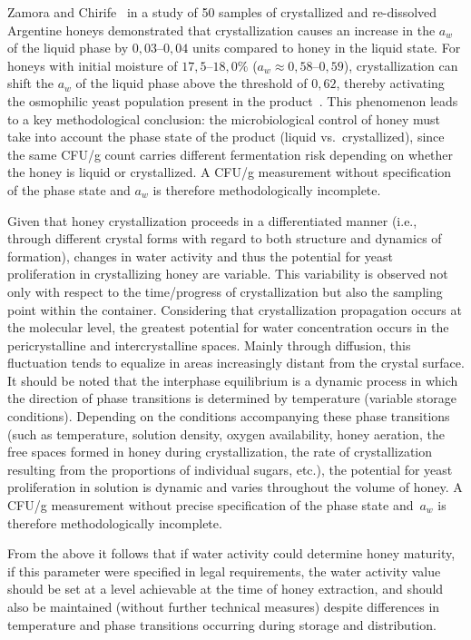 Zamora and Chirife~\cite{zamora2006} in a study of 50 samples
of crystallized and re-dissolved Argentine honeys demonstrated
that crystallization causes an increase in the $a_w$ of the liquid
phase by $0{,}03$--$0{,}04$ units compared to honey in the liquid
state. For honeys with initial moisture of $17{,}5$--$18{,}0\%$
($a_w \approx 0{,}58$--$0{,}59$), crystallization can shift the
$a_w$ of the liquid phase above the threshold of $0{,}62$, thereby
activating the osmophilic yeast population present in the
product~\cite{zamora2006,ijfans2019}.
This phenomenon leads to a key methodological conclusion: the
microbiological control of honey must take into account the phase
state of the product (liquid vs.\ crystallized), since the same
CFU/g count carries different fermentation risk depending on whether
the honey is liquid or crystallized. A CFU/g measurement without
specification of the phase state and $a_w$ is therefore
methodologically incomplete.

Given that honey crystallization proceeds in a differentiated
manner (i.e., through different crystal forms with regard to both
structure and dynamics of formation), changes in water activity
and thus the potential for yeast proliferation in crystallizing
honey are variable. This variability is observed not only with
respect to the time/progress of crystallization but also the
sampling point within the container. Considering that crystallization
propagation occurs at the molecular level, the greatest potential
for water concentration occurs in the pericrystalline and
intercrystalline spaces. Mainly through diffusion, this fluctuation
tends to equalize in areas increasingly distant from the crystal
surface. It should be noted that the interphase equilibrium is a
dynamic process in which the direction of phase transitions is
determined by temperature (variable storage conditions). Depending
on the conditions accompanying these phase transitions (such as
temperature, solution density, oxygen availability, honey aeration,
the free spaces formed in honey during crystallization, the rate of
crystallization resulting from the proportions of individual sugars,
etc.), the potential for yeast proliferation in solution is dynamic
and varies throughout the volume of honey. A CFU/g measurement
without precise specification of the phase state and~$a_w$ is
therefore methodologically incomplete.

From the above it follows that if water activity could determine
honey maturity, if this parameter were specified in legal
requirements, the water activity value should be set at a level
achievable at the time of honey extraction, and should also be
maintained (without further technical measures) despite differences
in temperature and phase transitions occurring during storage and
distribution.

